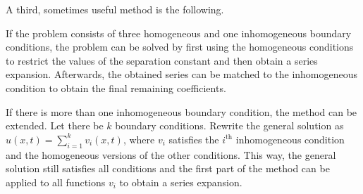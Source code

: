     A third, sometimes useful method is the following.
    \begin{method}
        If the problem consists of three homogeneous and one inhomogeneous boundary conditions, the problem can be solved by first using the homogeneous conditions to restrict the values of the separation constant and then obtain a series expansion. Afterwards, the obtained series can be matched to the inhomogeneous condition to obtain the final remaining coefficients.

        If there is more than one inhomogeneous boundary condition, the method can be extended. Let there be $k$ boundary conditions. Rewrite the general solution as $u(x,t) = \sum_{i=1}^kv_i(x,t)$, where $v_i$ satisfies the $i^{\text{th}}$ inhomogeneous condition and the homogeneous versions of the other conditions. This way, the general solution still satisfies all conditions and the first part of the method can be applied to all functions $v_i$ to obtain a series expansion.
    \end{method}

